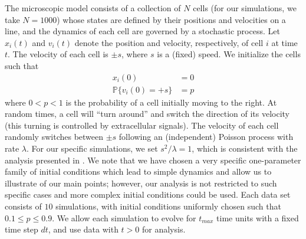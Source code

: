 The microscopic model consists of a collection of $N$ cells (for our simulations, we take $N=1000$) whose states are defined by their positions and velocities on a line, and the dynamics of each cell are governed by a stochastic process.
%
Let $x_i(t)$ and $v_i(t)$ denote the position and velocity, respectively, of cell $i$ at time $t$.
%
The velocity of each cell is $\pm s$, where $s$ is a (fixed) speed.
%
We initialize the cells such that
\begin{equation}\label{eqn:system}
\begin{aligned}
x_i(0) & = 0 \\
\mathbb{P} \{ v_i(0) = +s \} & = p
\end{aligned}
\end{equation}
where $0 < p < 1$ is the probability of a cell initially moving to the right.
%
At random times, a cell will ``turn around'' and switch the direction of its velocity (this turning is controlled by extracellular signals).
%
The velocity of each cell randomly switches between $\pm s$ following an (independent) Poisson process with rate $\lambda$.
%
For our specific simulations, we set $s^2/\lambda=1$, which is consistent with the analysis presented in \cite{othmer1988models}.
%
We note that we have chosen a very specific one-parameter family of initial conditions which lead to simple dynamics and allow us to illustrate of our main points;
however, our analysis is not restricted to such specific cases and more complex initial conditions could be used.
%
Each data set consists of $10$ simulations, with initial conditions uniformly chosen such that $0.1 \le p  \le 0.9$.
%
We allow each simulation to evolve for $t_{max}$ time units with a fixed time step $dt$, and use data with $t > 0$ for analysis.

